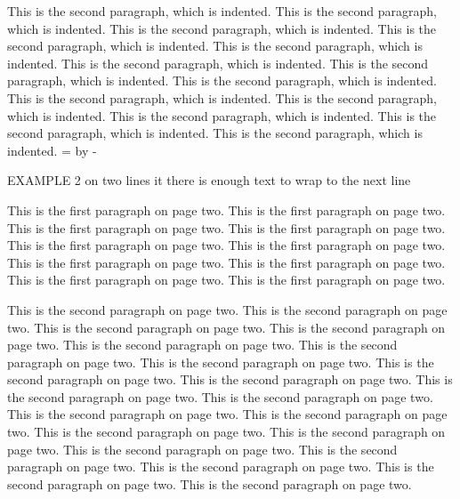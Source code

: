 \documentclass[11pt,a4paper,english]{book}
\begin{document}
\vskip 10.63629pt
\vskip -5.55141pt %
\vskip -12pt %
\vskip -10.81811pt
This is the second paragraph, which is indented.
This is the second paragraph, which is indented.
This is the second paragraph, which is indented.
This is the second paragraph, which is indented.
This is the second paragraph, which is indented.
This is the second paragraph, which is indented.
This is the second paragraph, which is indented.
This is the second paragraph, which is indented.
This is the second paragraph, which is indented.
This is the second paragraph, which is indented.
This is the second paragraph, which is indented.
This is the second paragraph, which is indented.
This is the second paragraph, which is indented.
\pageleft=\pagegoal
\advance\pageleft by -\pagetotal
{}
\begin{importantnote}
EXAMPLE 2
on two lines it there is enough text to wrap to the next line
\end{importantnote}
This is the first paragraph on page two.
This is the first paragraph on page two.
This is the first paragraph on page two.
This is the first paragraph on page two.
This is the first paragraph on page two.
This is the first paragraph on page two.
This is the first paragraph on page two.
This is the first paragraph on page two.
This is the first paragraph on page two.
This is the first paragraph on page two.

This is the second paragraph on page two.
This is the second paragraph on page two.
This is the second paragraph on page two.
This is the second paragraph on page two.
This is the second paragraph on page two.
This is the second paragraph on page two.
This is the second paragraph on page two.
This is the second paragraph on page two.
This is the second paragraph on page two.
This is the second paragraph on page two.
This is the second paragraph on page two.
This is the second paragraph on page two.
This is the second paragraph on page two.
This is the second paragraph on page two.
This is the second paragraph on page two.
This is the second paragraph on page two.
This is the second paragraph on page two.
This is the second paragraph on page two.
This is the second paragraph on page two.
This is the second paragraph on page two.
\end{document}
